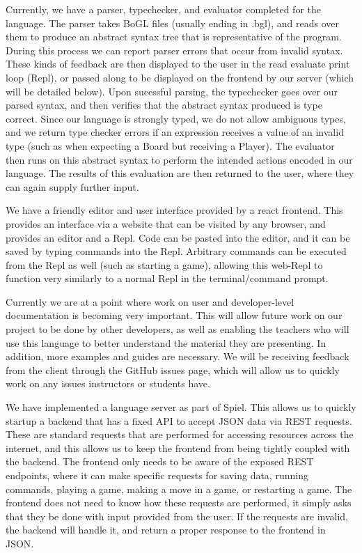 \documentclass[onecolumn, draftclsnofoot,10pt, compsoc]{IEEEtran}
\begin{document}
\begin{singlespace}
    Currently, we have a parser, typechecker, and evaluator completed for the language. The parser takes BoGL files (usually ending in .bgl), and reads over them to produce an abstract syntax tree that is representative of the program. During this process we can report parser errors that occur from invalid syntax. These kinds of feedback are then displayed to the user in the read evaluate print loop (Repl), or passed along to be displayed on the frontend by our server (which will be detailed below). Upon sucessful parsing, the typechecker goes over our parsed syntax, and then verifies that the abstract syntax produced is type correct. Since our language is strongly typed, we do not allow ambiguous types, and we return type checker errors if an expression receives a value of an invalid type (such as when expecting a Board but receiving a Player). The evaluator then runs on this abstract syntax to perform the intended actions encoded in our language. The results of this evaluation are then returned to the user, where they can again supply further input.
    
    We have a friendly editor and user interface provided by a react frontend. This provides an interface via a website that can be visited by any browser, and provides an editor and a Repl. Code can be pasted into the editor, and it can be saved by typing commands into the Repl. Arbitrary commands can be executed from the Repl as well (such as starting a game), allowing this web-Repl to function very similarly to a normal Repl in the terminal/command prompt.
    
    Currently we are at a point where work on user and developer-level documentation is becoming very important. This will allow future work on our project to be done by other developers, as well as enabling the teachers who will use this language to better understand the material they are presenting. In addition, more examples and guides are necessary. We will be receiving feedback from the client through the GitHub issues page, which will allow us to quickly work on any issues instructors or students have.
    
    We have implemented a language server as part of Spiel. This allows us to quickly startup a backend that has a fixed API to accept JSON data via REST requests. These are standard requests that are performed for accessing resources across the internet, and this allows us to keep the frontend from being tightly coupled with the backend. The frontend only needs to be aware of the exposed REST endpoints, where it can make specific requests for saving data, running commands, playing a game, making a move in a game, or restarting a game. The frontend does not need to know how these requests are performed, it simply asks that they be done with input provided from the user. If the requests are invalid, the backend will handle it, and return a proper response to the frontend in JSON.
    

\end{singlespace}
\end{document}
